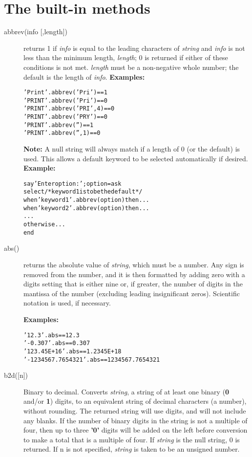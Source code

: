\section{The built-in methods}\label{builtinmethods}
\begin{description}
\item[abbrev(info [,length{]})]\label{refabbrev}
returns 1 if \emph{info} is equal to the leading characters of
\emph{string} and \emph{info} is not less than
the minimum length, \emph{length}; 0 is returned
if either of these conditions is not met.
\emph{length} must be a non-negative whole number; the default is
the length of \emph{info}.
 \textbf{Examples:}
\begin{alltt}
'Print'.abbrev('Pri')   == 1
'PRINT'.abbrev('Pri')   == 0
'PRINT'.abbrev('PRI',4) == 0
'PRINT'.abbrev('PRY')   == 0
'PRINT'.abbrev('')      == 1
'PRINT'.abbrev('',1)    == 0
\end{alltt}
\textbf{Note: }A null string will always match if a length of 0 (or the default)
is used.
This allows a default keyword to be selected automatically if desired.
 \textbf{Example:}
\begin{alltt}
say 'Enter option:';  option=ask
select  /* keyword1 is to be the default */
  when 'keyword1'.abbrev(option) then ...
  when 'keyword2'.abbrev(option) then ...
     ...
  otherwise ...
  end
\end{alltt}
\item[abs()]\label{refabs}
returns the absolute value of \emph{string}, which must be a
number.
 Any sign is removed from the number, and it is then formatted by adding
zero with a digits setting that is either nine or, if greater, the
number of digits in the mantissa of the number (excluding leading
insignificant zeros).
Scientific notation is used, if necessary.
 
\textbf{Examples:}
\begin{alltt}
'12.3'.abs              == 12.3
' -0.307'.abs           == 0.307
'123.45E+16'.abs        == 1.2345E+18
'- 1234567.7654321'.abs == 1234567.7654321
\end{alltt}

\item[b2d([n{]})]\label{refb2x}
 Binary to decimal.
Converts \emph{string}, a string of at least one binary
(\textbf{0} and/or \textbf{1}) digits, to an equivalent string of
decimal characters (a number), without rounding.
The returned string will use digits,
and will not include any blanks.
 If the number of binary digits in the string is not a multiple of four,
then up to three \textbf{'0'} digits will be added on the left before
conversion to make a total that is a multiple of four.
 If \emph{string} is the null string, 0 is returned. If n is not specified, \emph{string} is taken to be an unsigned number.


\end{description}
